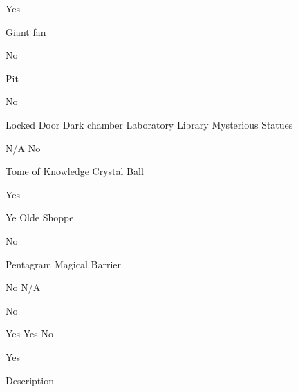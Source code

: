 \documentclass{book}
\begin{document}
\begin{itemize}
Yes

Giant fan

No

Pit

No

Locked Door
Dark
chamber
Laboratory
Library
Mysterious
Statues

N/A
No

Tome of
Knowledge
Crystal Ball

Yes

Ye Olde
Shoppe

No

Pentagram
Magical
Barrier

No
N/A

No

Yes
Yes
No

Yes

Description


\end{itemize}
\end{document}
